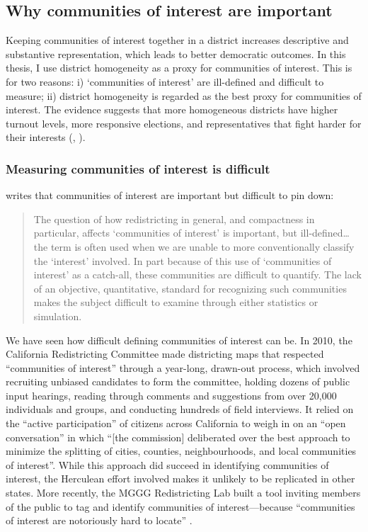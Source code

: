 \documentclass[]{article}
\begin{document}
\hypertarget{why-communities-of-interest-are-important}{%
\subsection{Why communities of interest are
important}\label{why-communities-of-interest-are-important}}

Keeping communities of interest together in a district increases
descriptive and substantive representation, which leads to better
democratic outcomes. In this thesis, I use district homogeneity as a
proxy for communities of interest. This is for two reasons: i)
`communities of interest' are ill-defined and difficult to measure; ii)
district homogeneity is regarded as the best proxy for communities of
interest. The evidence suggests that more homogeneous districts have
higher turnout levels, more responsive elections, and representatives
that fight harder for their interests (\cite{steph2012},
\cite{ogrady2018}).

\hypertarget{measuring-communities-of-interest-is-difficult}{%
\subsubsection{Measuring communities of interest is
difficult}\label{measuring-communities-of-interest-is-difficult}}

\citeauthor{altman1998} writes that communities of interest are
important but difficult to pin down:

\begin{quote}
The question of how redistricting in general, and compactness in
particular, affects `communities of interest' is important, but
ill-defined\ldots{} the term is often used when we are unable to more
conventionally classify the `interest' involved. In part because of this
use of `communities of interest' as a catch-all, these communities are
difficult to quantify. The lack of an objective, quantitative, standard
for recognizing such communities makes the subject difficult to examine
through either statistics or simulation.
\end{quote}

We have seen how difficult defining communities of interest can be. In
2010, the California Redistricting Committee made districting maps that
respected ``communities of interest'' through a year-long, drawn-out
process, which involved recruiting unbiased candidates to form the
committee, holding dozens of public input hearings, reading through
comments and suggestions from over 20,000 individuals and groups, and
conducting hundreds of field interviews. It relied on the ``active
participation'' of citizens across California to weigh in on an ``open
conversation'' in which ``{[}the commission{]} deliberated over the best
approach to minimize the splitting of cities, counties, neighbourhoods,
and local communities of interest''. While this approach did succeed in
identifying communities of interest, the Herculean effort involved makes
it unlikely to be replicated in other states. More recently, the MGGG
Redistricting Lab built a tool inviting members of the public to tag and
identify communities of interest---because ``communities of interest are
notoriously hard to locate'' \citep{mggg2020}.
\end{document}
